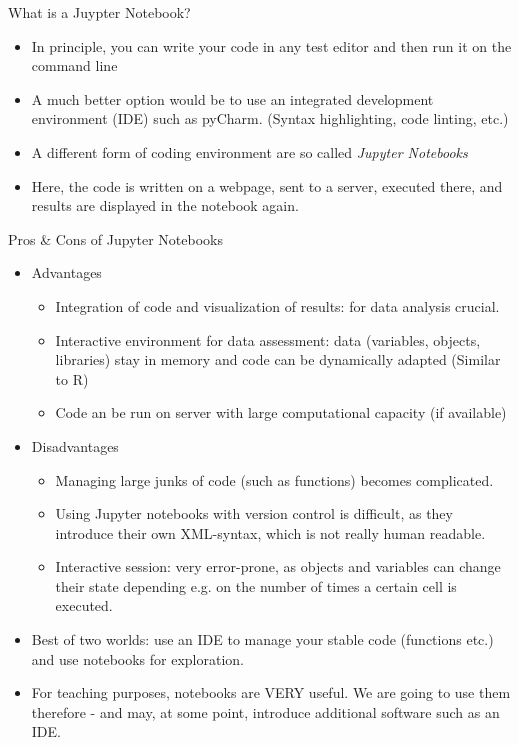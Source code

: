 \begin{frame}{What is a Juypter Notebook?}

	\begin{itemize}
		\item In principle, you can write your code in any test editor and then run it on the command line
		\item A much better option would be to use an integrated development environment (IDE) such as pyCharm. (Syntax highlighting, code linting, etc.)
		\item A different form of coding environment are so called \textit{Jupyter Notebooks}
		\item Here, the code is written on a webpage, sent to a server, executed there, and results are displayed in the notebook again.

	\end{itemize}


\end{frame}

\begin{frame}{Pros \& Cons of Jupyter Notebooks}

\begin{itemize}
		\item Advantages
	\begin{itemize}
		\item Integration of code and visualization of results: for data analysis crucial.
		\item Interactive environment for data assessment: data (variables, objects, libraries) stay in memory and code can be dynamically adapted (Similar to R)
		\item Code an be run on server with large computational capacity (if available)

	\end{itemize}
	\item Disadvantages
	\begin{itemize}
		\item Managing large junks of code (such as functions) becomes complicated.
		\item Using Jupyter notebooks with version control is difficult, as they introduce their own XML-syntax, which is not really human readable.
		\item Interactive session: very error-prone, as objects and variables can change their state depending e.g. on the number of times a certain cell is executed.
	\end{itemize}

	\item Best of two worlds: use an IDE to manage your stable code (functions etc.) and use notebooks for exploration.
	\item For teaching purposes, notebooks are VERY useful. We are going to use them therefore - and may, at some point, introduce additional software such as an IDE.
\end{itemize}

\end{frame}

